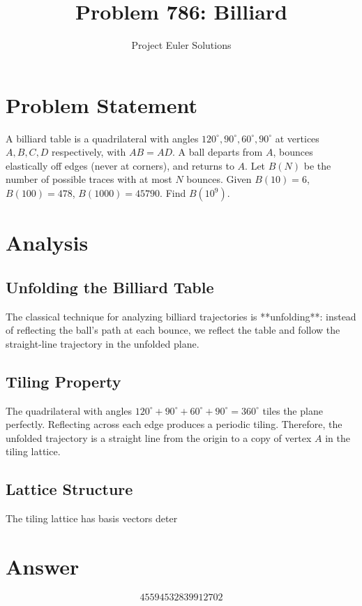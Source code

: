 \documentclass[11pt]{article}
\title{Problem 786: Billiard}
\author{Project Euler Solutions}
\date{}
\begin{document}
\maketitle
\section{Problem Statement}
A billiard table is a quadrilateral with angles $120^\circ, 90^\circ, 60^\circ, 90^\circ$ at vertices $A, B, C, D$ respectively, with $AB = AD$. A ball departs from $A$, bounces elastically off edges (never at corners), and returns to $A$. Let $B(N)$ be the number of possible traces with at most $N$ bounces. Given $B(10)=6$, $B(100)=478$, $B(1000)=45790$. Find $B(10^9)$.
\section{Analysis}
\subsection*{Unfolding the Billiard Table}

The classical technique for analyzing billiard trajectories is **unfolding**: instead of reflecting the ball's path at each bounce, we reflect the table and follow the straight-line trajectory in the unfolded plane.

\subsection*{Tiling Property}

The quadrilateral with angles $120^\circ + 90^\circ + 60^\circ + 90^\circ = 360^\circ$ tiles the plane perfectly. Reflecting across each edge produces a periodic tiling. Therefore, the unfolded trajectory is a straight line from the origin to a copy of vertex $A$ in the tiling lattice.

\subsection*{Lattice Structure}

The tiling lattice has basis vectors deter
\section{Answer}

\[
\boxed{45594532839912702}
\]
\end{document}
